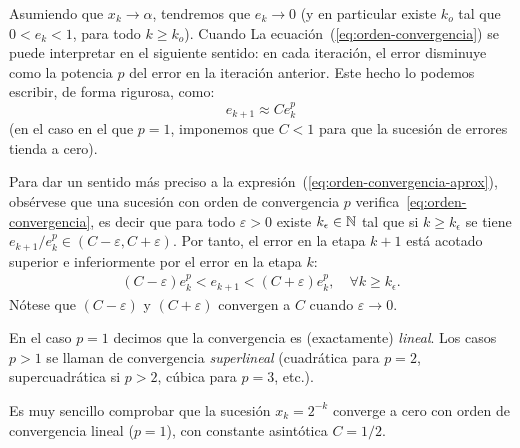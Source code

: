 \begin{remark}
  Asumiendo que $x_k \to \alpha$, tendremos que $e_k \to 0$ (y en
  particular existe $k_o$ tal que $0<e_k<1$, para todo $k\ge
  k_o$).
  Cuando La ecuación~(\ref{eq:orden-convergencia}) se puede
  interpretar en el siguiente sentido: en cada iteración, el error
  disminuye como la potencia $p$ del error en la iteración anterior.
  Este hecho lo podemos escribir, de forma rigurosa, como:
  \begin{equation}
    \label{eq:orden-convergencia-aprox}
    e_{k+1} \approx C e_k^p
  \end{equation}
  (en el caso en el que $p=1$, imponemos que $C<1$ para que la
  sucesión de errores tienda a cero).

  Para dar un sentido más preciso a la
  expresión~(\ref{eq:orden-convergencia-aprox}), obsérvese que una
  sucesión con orden de convergencia $p$
  verifica~\eqref{eq:orden-convergencia}, es decir que para todo
  $\varepsilon>0$ existe $k_\epsilon\in\operatorname{{\mathbb N}}$ tal que si
  $k\ge k_\epsilon$ se tiene
  ${e_{k+1}}/{e_k^p} \in (C-\varepsilon,C+\varepsilon)$.  Por tanto, el
  error en la etapa $k+1$ está acotado superior e inferiormente por el
  error en la etapa $k$:
    \begin{align*}
      (C-\varepsilon) e_k^p < e_{k+1} <
      (C+\varepsilon)  e_k^p, \quad \forall k \ge k_\epsilon.
    \end{align*}
    Nótese que $(C-\varepsilon)$ y $(C+\varepsilon)$ convergen a $C$
    cuando $\varepsilon\to 0$.
\end{remark}

En el caso $p=1$ decimos que la convergencia es (exactamente)
\textit{lineal}. Los casos $p>1$ se llaman de convergencia
\textit{superlineal} (cuadrática para $p=2$, supercuadrática si $p>2$,
cúbica para $p=3$, etc.).

\begin{example}
  \label{rk:2}
  Es muy sencillo comprobar que la sucesión $x_k=2^{-k}$ converge a cero
  con orden de convergencia lineal ($p=1$), con constante asintótica $C=1/2$.
\end{example}


